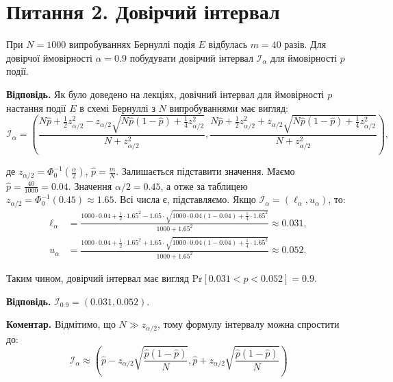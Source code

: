 \documentclass{../hw_template}
\begin{document}
\newpage

\section{Питання 2. Довірчий інтервал}

\begin{problems}
    При $N=1000$ випробуваннях Бернуллі подія $E$ відбулась $m=40$ разів. Для
довірчої ймовірності $\alpha = 0.9$ побудувати довірчий інтервал
$\mathcal{I}_{\alpha}$ для ймовірності $p$ події.
\end{problems}

\textbf{Відповідь.} Як було доведено на лекціях, довічний інтервал для ймовірності $p$ настання 
події $E$ в схемі Бернуллі з $N$ випробуваннями має вигляд:
\begin{equation*}
    \mathcal{I}_{\alpha} = \left(\frac{N\hat{p} + \frac{1}{2}z_{\alpha/2}^2 - z_{\alpha/2}\sqrt{N\hat{p}(1-\hat{p})+\frac{1}{4}z_{\alpha/2}^2}}{N+z_{\alpha/2}^2}, \frac{N\hat{p} + \frac{1}{2}z_{\alpha/2}^2 + z_{\alpha/2}\sqrt{N\hat{p}(1-\hat{p})+\frac{1}{4}z_{\alpha/2}^2}}{N+z_{\alpha/2}^2}\right),
\end{equation*}

де $z_{\alpha/2} = \Phi_0^{-1}\left(\frac{\alpha}{2}\right)$, $\hat{p} =
\frac{m}{N}$. Залишається підставити значення. Маємо $\hat{p} = \frac{40}{1000}
= 0.04$. Значення $\alpha/2 = 0.45$, а отже за таблицею $z_{\alpha/2} =
\Phi_0^{-1}(0.45) \approx 1.65$. Всі числа є, підставляємо. Якщо $\mathcal{I}_{\alpha} = (\ell_{\alpha}, u_{\alpha})$, то:
\begin{align*}
    \ell_{\alpha} &= \frac{1000 \cdot 0.04 + \frac{1}{2}\cdot 1.65^2 - 1.65 \cdot \sqrt{1000 \cdot 0.04(1-0.04)+\frac{1}{4}\cdot 1.65^2}}{1000+1.65^2} \approx 0.031, \\
    u_{\alpha} &= \frac{1000 \cdot 0.04 + \frac{1}{2}\cdot 1.65^2 + 1.65 \cdot \sqrt{1000 \cdot 0.04(1-0.04)+\frac{1}{4}\cdot 1.65^2}}{1000+1.65^2} \approx 0.052.
\end{align*}

Таким чином, довірчий інтервал має вигляд $\text{Pr}[0.031 < p < 0.052] = 0.9$. 

\textbf{Відповідь.} $\mathcal{I}_{0.9} = (0.031, 0.052)$.

\vspace{10px}

\textbf{Коментар.} Відмітимо, що $N \gg z_{\alpha/2}$, тому формулу інтервалу можна спростити до:
\begin{equation*}
    \mathcal{I}_{\alpha} \approx \left(\hat{p} - z_{\alpha/2}\sqrt{\frac{\hat{p}(1-\hat{p})}{N}}, \hat{p} + z_{\alpha/2}\sqrt{\frac{\hat{p}(1-\hat{p})}{N}}\right)
\end{equation*}
\end{document}
